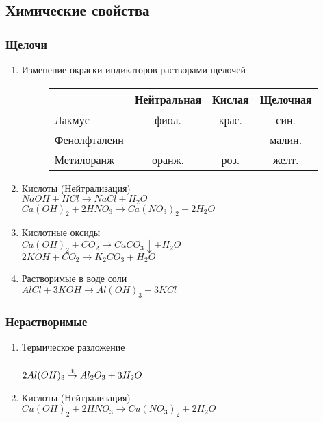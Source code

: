\subsection{Химические свойства}
\subsubsection{Щелочи}
\begin{enumerate}
    \item Изменение окраски индикаторов растворами щелочей
        \begin{figure*}[h!]
            \begin{tabular}[b]{| l | c | c | c |}
                \hline
                      & Нейтральная & Кислая & Щелочная \\
                \hline
                Лакмус & фиол. & крас. & син. \\
                \hline
                Фенолфталеин & --- & --- & малин. \\
                \hline
                Метилоранж & оранж. & роз. & желт. \\
                \hline
            \end{tabular}
        \end{figure*}

    \item Кислоты (Нейтрализация)\\
        $NaOH + HCl \rightarrow NaCl + H_2O$\\
        $Ca(OH)_2 + 2HNO_3 \rightarrow Ca(NO_3)_2 + 2H_2O$

    \item Кислотные оксиды\\
        $Ca(OH)_2 + CO_2 \rightarrow CaCO_3\downarrow + H_2O$\\
        $2KOH + CO_2 \rightarrow K_2CO_3 + H_2O$

    \item Растворимые в воде соли\\
        $AlCl + 3KOH \rightarrow Al(OH)_3 + 3KCl$

\end{enumerate}


\subsubsection{Нерастворимые}
\begin{enumerate}
    \item Термическое разложение\\
        \\
        $2Al(OH)_3 \stackrel{t}{\rightarrow} Al_2O_3 + 3H_2O$

    \item Кислоты (Нейтрализация)\\
        $Cu(OH)_2 + 2HNO_3 \rightarrow Cu(NO_3)_2 + 2H_2O$
\end{enumerate}
